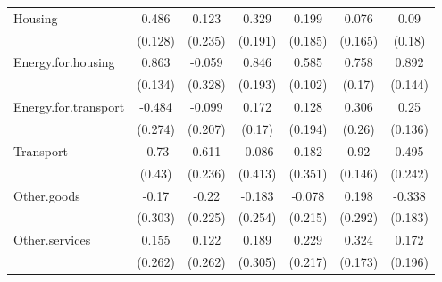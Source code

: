 \begin{tabular}{lcccccc}
  Housing & 0.486 & 0.123 & 0.329 & 0.199 & 0.076 & 0.09 \\ 
   & (0.128) & (0.235) & (0.191) & (0.185) & (0.165) & (0.18) \\ 
  Energy.for.housing & 0.863 & -0.059 & 0.846 & 0.585 & 0.758 & 0.892 \\ 
   & (0.134) & (0.328) & (0.193) & (0.102) & (0.17) & (0.144) \\ 
  Energy.for.transport & -0.484 & -0.099 & 0.172 & 0.128 & 0.306 & 0.25 \\ 
   & (0.274) & (0.207) & (0.17) & (0.194) & (0.26) & (0.136) \\ 
  Transport & -0.73 & 0.611 & -0.086 & 0.182 & 0.92 & 0.495 \\ 
   & (0.43) & (0.236) & (0.413) & (0.351) & (0.146) & (0.242) \\ 
  Other.goods & -0.17 & -0.22 & -0.183 & -0.078 & 0.198 & -0.338 \\ 
   & (0.303) & (0.225) & (0.254) & (0.215) & (0.292) & (0.183) \\ 
  Other.services & 0.155 & 0.122 & 0.189 & 0.229 & 0.324 & 0.172 \\ 
   & (0.262) & (0.262) & (0.305) & (0.217) & (0.173) & (0.196) \\ 
   \hline
\end{tabular}